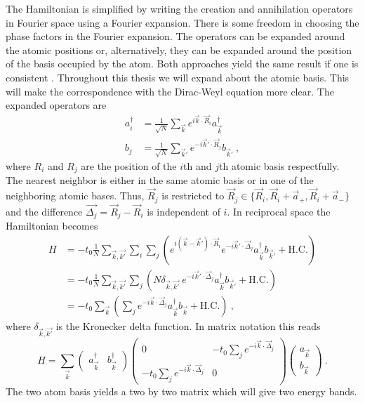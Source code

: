 The Hamiltonian is simplified by writing the creation and annihilation operators in Fourier space using a Fourier expansion.
There is some freedom in choosing the phase factors in the Fourier expansion.
The operators can be expanded around the atomic positions or, alternatively, they can be expanded around the position of the basis occupied by the atom.
Both approaches yield the same result if one is consistent \cite{Bena2009}.
Throughout this thesis we will expand about the atomic basis.
This will make the correspondence with the Dirac-Weyl equation more clear.
The expanded operators are
\begin{align}
	a_i^{\dagger}&=\frac{1}{\sqrt{N}}\sum_{\vec{k} } e^{ i \vec{k}  \cdot \vec{R}_i} a_{\vec{k} }^{\dagger} \nonumber \\
	b_j          &=\frac{1}{\sqrt{N}}\sum_{\vec{k}'} e^{-i \vec{k}' \cdot \vec{R}_j} b_{\vec{k}'} \ ,
	\label{eq:TB:FT} 
\end{align}
where $R_i$ and $R_j$ are the position of the $i$th and $j$th atomic basis respectfully.  
The nearest neighbor is either in the same atomic basis or in one of the neighboring atomic bases.
Thus, $\vec{R}_j$ is restricted to $\vec{R}_j \in \{ \vec{R}_i,\vec{R}_i+\vec{a}_+,\vec{R}_i+\vec{a}_-\}$ and the difference $\vec{\Delta_j}=\vec{R}_j-\vec{R}_i$ is independent of $i$.
In reciprocal space the Hamiltonian becomes
\begin{align}
	H&=-t_0 \frac{1}{N} \sum_{\vec{k},\vec{k'}}\sum_i\sum_j \left( e^{i (\vec{k}-\vec{k}') \cdot \vec{R}_i}
		e^{-i \vec{k}' \cdot \vec{\Delta}_j}
		a^{\dagger}_{\vec{k}} b_{\vec{k}'} + \text{H.C.} \right) \nonumber \\
	 &=-t_0 \frac{1}{N} \sum_{\vec{k},\vec{k'}}\sum_j \left( N \delta_{\vec{k},\vec{k'}} \
	 	e^{-i \vec{k}' \cdot \vec{\Delta}_j}
		a^{\dagger}_{\vec{k}} b_{\vec{k}'} + \text{H.C.}\right) \nonumber \\ 
	 &=-t_0 \sum_{\vec{k}}\left( \sum_{j} e^{-i \vec{k} \cdot \vec{\Delta}_j} a^{\dagger}_{\vec{k}} b_{\vec{k}} + \text{H.C.} \right) \label{eq:TB:FTing}\ ,
\end{align}
where $\delta_{\vec{k},\vec{k'}}$ is the Kronecker delta function.
In matrix notation this reads
\begin{equation}
	H=\sum_{\vec k} 
		\left( \begin{array}{cc} a^{\dagger}_{\vec{k}} & b^{\dagger}_{\vec{k}} \end{array} \right)
		\left( \begin{array}{cc}
			0              & -t_0 \sum_{j} e^{-i \vec{k} \cdot \vec{\Delta}_j} \\
			-t_0 \sum_{j} e^{-i \vec{k} \cdot \vec{\Delta}_j} & 0               \end{array} \right)
		\left( \begin{array}{c } a_{\vec{k}}           \\ b_{\vec{k}}          \end{array} \right) \ .
	\label{eq:TB:fullH}
\end{equation}
The two atom basis yields a two by two matrix which will give two energy bands.

